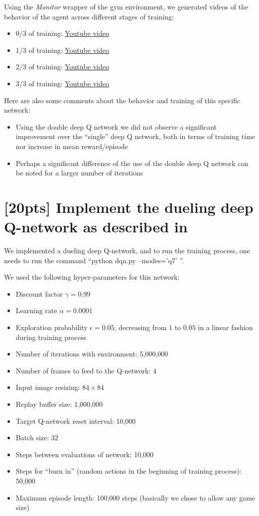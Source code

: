 \documentclass{article}
\begin{document}
Using the \textit{Monitor} wrapper of the gym environment, we generated videos of the behavior of the agent across different stages of training:

\begin{itemize}
  \item 0/3 of training: \href{https://youtu.be/gQyl3_41mNg}{Youtube video}
  \item 1/3 of training: \href{https://youtu.be/HhjOkGd-0XQ}{Youtube video}
  \item 2/3 of training: \href{https://youtu.be/uM4EIknVpzw}{Youtube video}
  \item 3/3 of training: \href{https://youtu.be/_uGdpp2GWYU}{Youtube video}
\end{itemize}

Here are also some comments about the behavior and training of this specific network:

\begin{itemize}
  \item Using the double deep Q network we did not observe a significant improvement over the ``single'' deep Q network, both in terms of training time nor increase in mean reward/episode
  \item Perhaps a significant difference of the use of the double deep Q network can be noted for a larger number of iterations
\end{itemize}

\section{[20pts] Implement the dueling deep Q-network as described in \cite{wang2015dueling}}

We implemented a dueling deep Q-network, and to run the training process, one needs to run the command ``python dqn.py --modes='q7' ''.

We used the following hyper-parameters for this network:
\begin{itemize}
  \item Discount factor $\gamma=0.99$
  \item Learning rate $\alpha=0.0001$
  \item Exploration probability $\epsilon=0.05$, decreasing from $1$ to $0.05$ in a linear fashion during training process
  \item Number of iterations with environment: 5,000,000
  \item Number of frames to feed to the Q-network: 4
  \item Input image resizing: $84\times84$
  \item Replay buffer size: 1,000,000
  \item Target Q-network reset interval: 10,000
  \item Batch size: 32
  \item Steps between evaluations of network: 10,000
  \item Steps for ``burn in'' (random actions in the beginning of training process): 50,000
  \item Maximum episode length: 100,000 steps (basically we chose to allow any game size)
\end{itemize}
\end{document}

